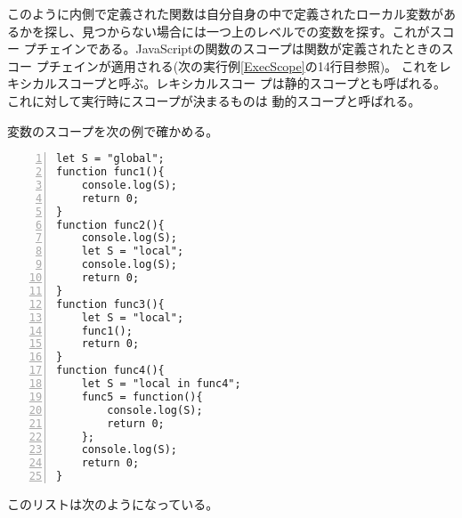 このように内側で定義された関数は自分自身の中で定義されたローカル変数があ
るかを探し、見つからない場合には一つ上のレベルでの変数を探す。これがスコー
プチェインである。JavaScriptの関数のスコープは関数が定義されたときのスコー
プチェインが適用される(次の実行例\ref{ExecScope}の14行目参照)。
これをレキシカルスコープと呼ぶ。レキシカルスコー
プは静的スコープとも呼ばれる。これに対して実行時にスコープが決まるものは
動的スコープと呼ばれる。
\begin{Exec}\label{ExecScope}\upshape
変数のスコープを次の例で確かめる。
\begin{Verbatim}[numbers=left]
let S = "global";
function func1(){
    console.log(S);
    return 0;
}
function func2(){
    console.log(S);
    let S = "local";
    console.log(S);
    return 0;
}
function func3(){
    let S = "local";
    func1();
    return 0;
}
function func4(){
    let S = "local in func4";
    func5 = function(){
        console.log(S);
        return 0;
    };
    console.log(S);
    return 0;
}
\end{Verbatim}
\end{Exec}
このリストは次のようになっている。
